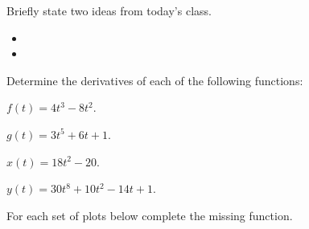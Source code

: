 \begin{problem}
\item Briefly state two ideas from today's class.
  \begin{itemize}
  \item
  \item
  \end{itemize}
  \item Determine the derivatives of each of the following functions:
    \begin{subproblem}
    \item $f(t)=4t^3-8t^2$.
      \vfill
    \item $g(t)=3t^5+6t + 1$.
      \vfill
    \item $x(t)=18t^2-20$.
      \vfill
    \item $y(t)=30t^8+10t^2 - 14 t + 1$.
      \vfill
  \end{subproblem}

  \clearpage

  \item For each set of plots below complete the missing function.
  \begin{subproblem}
    \item  ~ \\
    \scalebox{0.8}{}
    \item  ~ \\
    \scalebox{0.8}{}
    \item  ~ \\
    \scalebox{0.8}{}
    \item  ~ \\
    \scalebox{0.8}{}
    \item  ~ \\
    \scalebox{0.8}{}
    \item  ~ \\
    \scalebox{0.8}{}
  \end{subproblem}

\end{problem}





